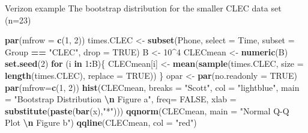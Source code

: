 \documentclass[
  ignorenonframetext,
]{beamer}
\newenvironment{Shaded}{\begin{snugshade}}{\end{snugshade}}
\newcommand{\AttributeTok}[1]{\textcolor[rgb]{0.13,0.29,0.53}{#1}}
\newcommand{\ConstantTok}[1]{\textcolor[rgb]{0.56,0.35,0.01}{#1}}
\newcommand{\ControlFlowTok}[1]{\textcolor[rgb]{0.13,0.29,0.53}{\textbf{#1}}}
\newcommand{\DecValTok}[1]{\textcolor[rgb]{0.00,0.00,0.81}{#1}}
\newcommand{\FunctionTok}[1]{\textcolor[rgb]{0.13,0.29,0.53}{\textbf{#1}}}
\newcommand{\NormalTok}[1]{#1}
\newcommand{\OtherTok}[1]{\textcolor[rgb]{0.56,0.35,0.01}{#1}}
\newcommand{\SpecialCharTok}[1]{\textcolor[rgb]{0.81,0.36,0.00}{\textbf{#1}}}
\newcommand{\StringTok}[1]{\textcolor[rgb]{0.31,0.60,0.02}{#1}}
\begin{document}
\begin{frame}[fragile]{Verizon example}
\protect\hypertarget{verizon-example-4}{}
The bootstrap distribution for the smaller CLEC data set (n=23)

\tiny

\begin{Shaded}
\begin{Highlighting}[]
\FunctionTok{par}\NormalTok{(}\AttributeTok{mfrow =} \FunctionTok{c}\NormalTok{(}\DecValTok{1}\NormalTok{, }\DecValTok{2}\NormalTok{))}
\NormalTok{times.CLEC }\OtherTok{\textless{}{-}} \FunctionTok{subset}\NormalTok{(Phone, }\AttributeTok{select =}\NormalTok{ Time, }\AttributeTok{subset =}\NormalTok{ Group }\SpecialCharTok{==} \StringTok{"CLEC"}\NormalTok{, }\AttributeTok{drop =} \ConstantTok{TRUE}\NormalTok{)}
\NormalTok{B }\OtherTok{\textless{}{-}} \DecValTok{10}\SpecialCharTok{\^{}}\DecValTok{4}
\NormalTok{CLECmean }\OtherTok{\textless{}{-}} \FunctionTok{numeric}\NormalTok{(B)}
\FunctionTok{set.seed}\NormalTok{(}\DecValTok{2}\NormalTok{)}
\ControlFlowTok{for}\NormalTok{ (i }\ControlFlowTok{in} \DecValTok{1}\SpecialCharTok{:}\NormalTok{B)\{}
\NormalTok{ CLECmean[i] }\OtherTok{\textless{}{-}} \FunctionTok{mean}\NormalTok{(}\FunctionTok{sample}\NormalTok{(times.CLEC, }\AttributeTok{size =} \FunctionTok{length}\NormalTok{(times.CLEC), }\AttributeTok{replace =} \ConstantTok{TRUE}\NormalTok{)) }
\NormalTok{\}}
\NormalTok{opar }\OtherTok{\textless{}{-}} \FunctionTok{par}\NormalTok{(}\AttributeTok{no.readonly =} \ConstantTok{TRUE}\NormalTok{)}
\FunctionTok{par}\NormalTok{(}\AttributeTok{mfrow=}\FunctionTok{c}\NormalTok{(}\DecValTok{1}\NormalTok{, }\DecValTok{2}\NormalTok{))}
\FunctionTok{hist}\NormalTok{(CLECmean, }\AttributeTok{breaks =} \StringTok{"Scott"}\NormalTok{, }\AttributeTok{col =} \StringTok{"lightblue"}\NormalTok{, }
     \AttributeTok{main =} \StringTok{"Bootstrap Distribution }\SpecialCharTok{\textbackslash{}n}\StringTok{ Figure a"}\NormalTok{, }
     \AttributeTok{freq=} \ConstantTok{FALSE}\NormalTok{, }\AttributeTok{xlab =} \FunctionTok{substitute}\NormalTok{(}\FunctionTok{paste}\NormalTok{(}\FunctionTok{bar}\NormalTok{(x),}\StringTok{"*"}\NormalTok{)))}
\FunctionTok{qqnorm}\NormalTok{(CLECmean, }\AttributeTok{main =} \StringTok{"Normal Q{-}Q Plot }\SpecialCharTok{\textbackslash{}n}\StringTok{ Figure b"}\NormalTok{)}
\FunctionTok{qqline}\NormalTok{(CLECmean, }\AttributeTok{col =} \StringTok{"red"}\NormalTok{)}
\end{Highlighting}
\end{Shaded}


\end{frame}
\end{document}
